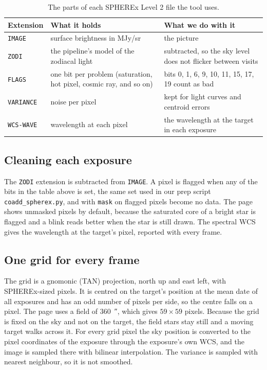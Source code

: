 \documentclass[11pt,a4paper]{article}
\begin{document}
\begin{table}[h]
\centering
\small
\begin{tabularx}{\linewidth}{@{}l X X@{}}
\toprule
Extension & What it holds & What we do with it \\
\midrule
\texttt{IMAGE} & surface brightness in MJy/sr & the picture \\
\texttt{ZODI} & the pipeline's model of the zodiacal light & subtracted, so the sky level does not flicker between visits \\
\texttt{FLAGS} & one bit per problem (saturation, hot pixel, cosmic ray, and so on) & bits 0, 1, 6, 9, 10, 11, 15, 17, 19 count as bad \\
\texttt{VARIANCE} & noise per pixel & kept for light curves and centroid errors \\
\texttt{WCS-WAVE} & wavelength at each pixel & the wavelength at the target in each exposure \\
\bottomrule
\end{tabularx}
\caption{The parts of each SPHEREx Level 2 file the tool uses.}
\end{table}

\subsection{Cleaning each exposure}
The \texttt{ZODI} extension is subtracted from \texttt{IMAGE}. A pixel is flagged when any of
the bits in the table above is set, the same set used in our prep script
\texttt{coadd\_spherex.py}, and with \texttt{mask} on flagged pixels become no data. The page
shows unmasked pixels by default, because the saturated core of a bright star is flagged and a
blink reads better when the star is still drawn. The spectral WCS gives the wavelength at the
target's pixel, reported with every frame.

\subsection{One grid for every frame}
The grid is a gnomonic (TAN) projection, north up and east left, with SPHEREx-sized pixels. It
is centred on the target's position at the mean date of all exposures and has an odd number of
pixels per side, so the centre falls on a pixel. The page uses a field of \SI{360}{\arcsecond},
which gives $59 \times 59$ pixels. Because the grid is fixed on the sky and not on the target,
the field stars stay still and a moving target walks across it. For every grid pixel the sky
position is converted to the pixel coordinates of the exposure through the exposure's own WCS,
and the image is sampled there with bilinear interpolation. The variance is sampled with
nearest neighbour, so it is not smoothed.
\end{document}
